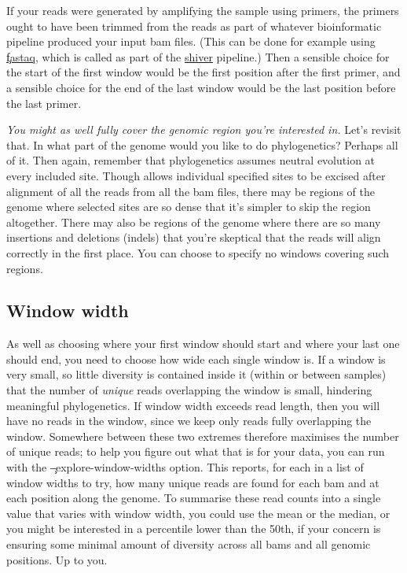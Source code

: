 If your reads were generated by amplifying the sample using primers, the primers ought to have been trimmed from the reads as part of whatever bioinformatic pipeline produced your input bam files.
(This can be done for example using \href{https://github.com/sanger-pathogens/Fastaq}{\color{blue} \underline{\c{fastaq}}}, which is called as part of the \href{https://github.com/ChrisHIV/shiver}{\c{\color{blue} \underline{shiver}}} pipeline.)
Then a sensible choice for the start of the first window would be the first position after the first primer, and a sensible choice for the end of the last window would be the last position before the last primer.

{\it You might as well fully cover the genomic region you're interested in.}
Let's revisit that.
In what part of the genome would you like to do phylogenetics?
Perhaps all of it.
Then again, remember that phylogenetics assumes neutral evolution at every included site.
Though \p allows individual specified sites to be excised after alignment of all the reads from all the bam files, there may be regions of the genome where selected sites are so dense that it's simpler to skip the region altogether.
There may also be regions of the genome where there are so many insertions and deletions (indels) that you're skeptical that the reads will align correctly in the first place.
You can choose to specify no windows covering such regions.

\subsection{Window width}
As well as choosing where your first window should start and where your last one should end, you need to choose how wide each single window is.
If a window is very small, so little diversity is contained inside it (within or between samples) that the number of {\it unique} reads overlapping the window is small, hindering meaningful phylogenetics.
If window width exceeds read length, then you will have no reads in the window, since we keep only reads fully overlapping the window.
Somewhere between these two extremes therefore maximises the number of unique reads; to help you figure out what that is for your data, you can run \p with the \c{--explore-window-widths} option.
This reports, for each in a list of window widths to try, how many unique reads are found for each bam and at each position along the genome.
To summarise these read counts into a single value that varies with window width, you could use the mean or the median, or you might be interested in a percentile lower than the 50th, if your concern is ensuring some minimal amount of diversity across all bams and all genomic positions.
Up to you.

